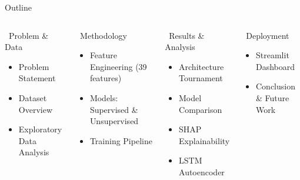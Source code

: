 \documentclass[aspectratio=169,10pt]{beamer}
\begin{document}
\begin{frame}{Outline}
\begin{columns}[t]
  \begin{block}{\faSearch\ Problem \& Data}
    \begin{itemize}\setlength\itemsep{3pt}
      \item Problem Statement
      \item Dataset Overview
      \item Exploratory Data Analysis
    \end{itemize}
  \end{block}\vspace{3pt}
  \begin{block}{\faCogs\ Methodology}
    \begin{itemize}\setlength\itemsep{3pt}
      \item Feature Engineering (39 features)
      \item Models: Supervised \& Unsupervised
      \item Training Pipeline
    \end{itemize}
  \end{block}
  \begin{block}{\faChartBar\ Results \& Analysis}
    \begin{itemize}\setlength\itemsep{3pt}
      \item Architecture Tournament
      \item Model Comparison
      \item SHAP Explainability
      \item LSTM Autoencoder
    \end{itemize}
  \end{block}\vspace{3pt}
  \begin{block}{\faRocket\ Deployment}
    \begin{itemize}\setlength\itemsep{3pt}
      \item Streamlit Dashboard
      \item Conclusion \& Future Work
    \end{itemize}
  \end{block}
\end{columns}
\end{frame}
\end{document}
